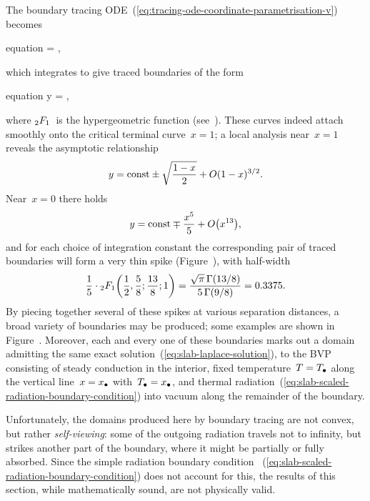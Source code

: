 The boundary tracing ODE~(\ref{eq:tracing-ode-coordinate-parametrisation-v})
becomes
\begin{important}{equation}
   = \mp {},
  \label{eq:slab-tracing-ode-coordinate-parametrisation-y}
\end{important}
which integrates to give traced boundaries of the form
\begin{important}{equation}
  y =
  \const
    \mp
    \cdot
  \hypergeo {},
  \label{eq:slab-traced-boundary}
\end{important}
where $\mathop{}\!{_2F_1}$~is the hypergeometric function
(see~\tbd).
These curves indeed attach smoothly
onto the critical terminal curve~$x = 1$;
a local analysis near~$x = 1$ reveals the asymptotic relationship
\begin{equation}
  y = \mathrm{const} \pm \sqrt{\frac{1 - x}{2}} + \mathop{}\! O (1 - x)^{3/2}.
  \label{eq:slab-traced-boundary-x-near-1}
\end{equation}
Near~$x = 0$ there holds
\begin{equation}
  y = \const \mp \frac{x^5}{5} + \order \roundbr*{x^{13}},
  \label{eq:slab-traced-boundary-x-near-0}
\end{equation}
and for each choice of integration constant
the corresponding pair of traced boundaries
will form a very thin spike (Figure~\tbd),
with half-width
\begin{equation}
  \frac{1}{5}
    \cdot
  \hypergeo \roundbr*{\frac{1}{2}, \frac{5}{8}; \frac{13}{8}; 1}
  = \frac{\sqrt{\pi} \gamm (13/8)}{5 \gamm (9/8)}
  = 0.3375.
  \label{eq:slab-traced-boundary-spike-half-width}
\end{equation}
By piecing together several of these spikes at various separation distances,
a broad variety of boundaries may be produced;
some examples are shown in Figure~\tbd.
Moreover, each and every one of these boundaries marks out a domain
admitting the same exact solution~(\ref{eq:slab-laplace-solution}),
to the BVP consisting of steady conduction in the interior,
fixed temperature~$T = T_\bullet$ along the vertical line~$x = x_\bullet$
with~$T_\bullet = x_\bullet$,
and thermal radiation~(\ref{eq:slab-scaled-radiation-boundary-condition})
into vacuum along the remainder of the boundary.

Unfortunately,
the domains produced here by boundary tracing are not convex,
but rather \emph{self-viewing}:
some of the outgoing radiation travels not to infinity,
but strikes another part of the boundary,
where it might be partially or fully absorbed.
Since the simple radiation boundary condition~%
  (\ref{eq:slab-scaled-radiation-boundary-condition})
does not account for this,
the results of this section,
while mathematically sound,
are not physically valid.

